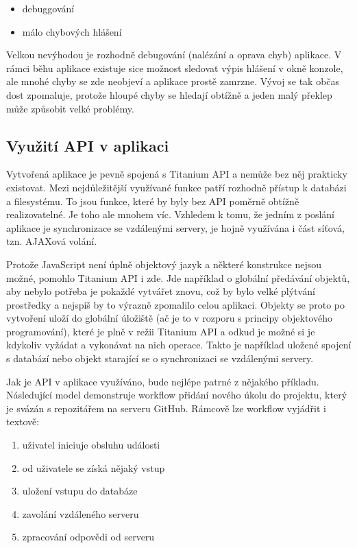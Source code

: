 \begin{itemize}
\item debuggování
\item málo chybových hlášení
\end{itemize}

Velkou nevýhodou je rozhodně debugování (nalézání a oprava chyb) aplikace. V rámci běhu aplikace existuje sice možnost sledovat výpis hlášení v okně konzole, ale mnohé chyby se zde neobjeví a aplikace prostě zamrzne. Vývoj se tak občas dost zpomaluje, protože hloupé chyby se hledají obtížně a jeden malý překlep může způsobit velké problémy.

\subsection{Využití API v aplikaci}

Vytvořená aplikace je pevně spojená s Titanium API a nemůže bez něj prakticky existovat. Mezi nejdůležitější využívané funkce patří rozhodně přístup k databázi a filesystému. To jsou funkce, které by byly bez API poměrně obtížně realizovatelné. Je toho ale mnohem víc. Vzhledem k tomu, že jedním z poslání aplikace je synchronizace se vzdálenými servery, je hojně využívána i část síťová, tzn. AJAXová volání. 

Protože JavaScript není úplně objektový jazyk a některé konstrukce nejsou možné, pomohlo Titanium API i zde. Jde například o globální předávání objektů, aby nebylo potřeba je pokaždé vytvářet znovu, což by bylo velké plýtvání prostředky a nejspíš by to výrazně zpomalilo celou aplikaci. Objekty se proto po vytvoření uloží do globální úložiště (ač je to v rozporu s principy objektového programování), které je plně v režii Titanium API a odkud je možné si je kdykoliv vyžádat a vykonávat na nich operace. Takto je například uložené spojení s databází nebo objekt starající se o synchronizaci se vzdálenými servery.

Jak je API v aplikace využíváno, bude nejlépe patrné z nějakého příkladu. Následující model demonstruje workflow přidání nového úkolu do projektu, který je svázán s repozitářem na serveru GitHub. Rámcově lze workflow vyjádřit i textově:

\begin{enumerate}
\item uživatel iniciuje obsluhu události
\item od uživatele se získá nějaký vstup
\item uložení vstupu do databáze
\item zavolání vzdáleného serveru
\item zpracování odpovědi od serveru
\end{enumerate}

